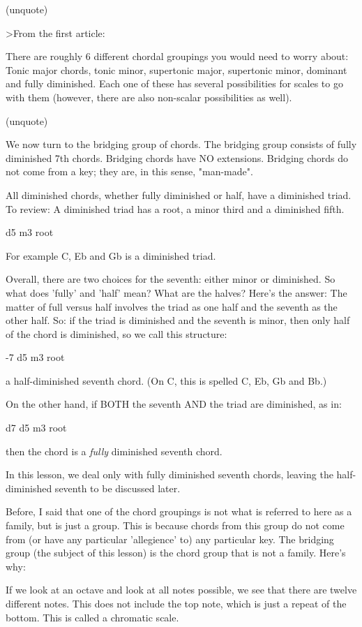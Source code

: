 (unquote)

>From the first article:

There are roughly 6 different chordal groupings you would need to worry about:
Tonic major chords, tonic minor, supertonic major, supertonic minor, dominant
and fully diminished. Each one of these has several possibilities for scales
to go with them (however, there are also non-scalar possibilities as well).

(unquote)

We now turn to the bridging group of chords. The bridging group consists of
fully diminished 7th chords. Bridging chords have NO extensions. Bridging
chords do not come from a key; they are, in this sense, "man-made".

All diminished chords, whether fully diminished or half, have a diminished
triad. To review: A diminished triad has a root, a minor third and a diminished
fifth.

 d5
 m3
root

For example C, Eb and Gb is a diminished triad.

Overall, there are two choices for the seventh: either minor or diminished.
So what does 'fully' and 'half' mean? What are the halves? Here's the answer:
The matter of full versus half involves the triad as one half and the seventh
as the other half. So: if the triad is diminished and the seventh is minor,
then only half of the chord is diminished, so we call this structure:

 -7
 d5
 m3
root

a half-diminished seventh chord. (On C, this is spelled C, Eb, Gb and Bb.)

On the other hand, if BOTH the seventh AND the triad are diminished, as in:

 d7
 d5
 m3
root

then the chord is a \emph{fully} diminished seventh chord.

In this lesson, we deal only with fully diminished seventh chords, leaving
the half-diminished seventh to be discussed later.

Before, I said that one of the chord groupings is not what is referred to
here as a family, but is just a group. This is because chords from this group
do not come from (or have any particular 'allegience' to) any particular key.
The bridging group (the subject of this lesson) is the chord group that is not
a family. Here's why:

If we look at an octave and look at all notes possible, we see that there
are twelve different notes. This does not include the top note, which is just
a repeat of the bottom. This is called a chromatic scale.


